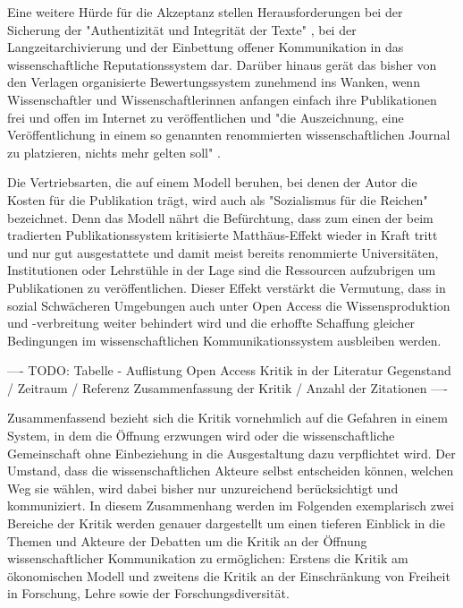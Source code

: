 Eine weitere Hürde für die Akzeptanz stellen Herausforderungen bei der Sicherung der "Authentizität und Integrität der Texte"  \cite{weishaupt_2009_goldenOA} \cite[:191]{Fehling_2014}, bei der Langzeitarchivierung \cite{hagner_2015_sache_buches} \cite{Martin_2013} und der Einbettung offener Kommunikation in das wissenschaftliche Reputationssystem \cite{weishaupt_2009_goldenOA} \cite{Suber_2002} \cite{Adema_2014_open_access} dar. Darüber hinaus gerät das bisher von den Verlagen organisierte Bewertungssystem zunehmend ins Wanken, wenn Wissenschaftler und Wissenschaftlerinnen anfangen einfach ihre Publikationen frei und offen im Internet zu veröffentlichen und "die Auszeichnung, eine Veröffentlichung in einem so genannten renommierten wissenschaftlichen Journal zu platzieren, nichts mehr gelten soll" \cite{Schirmbacher_oa_2007}.

Die Vertriebsarten, die auf einem Modell beruhen, bei denen der Autor die Kosten für die Publikation trägt, wird auch als "Sozialismus für die Reichen" \cite{cope2014future} bezeichnet. Denn das Modell nährt die Befürchtung, dass zum einen der beim tradierten Publikationssystem kritisierte Matthäus-Effekt wieder in Kraft tritt und nur gut ausgestattete und damit meist bereits renommierte Universitäten, Institutionen oder Lehrstühle in der Lage sind die Ressourcen aufzubrigen um Publikationen zu veröffentlichen. Dieser Effekt verstärkt die Vermutung, dass in sozial Schwächeren Umgebungen auch unter Open Access die Wissensproduktion und -verbreitung weiter behindert wird und die erhoffte Schaffung gleicher Bedingungen im wissenschaftlichen Kommunikationssystem ausbleiben werden.

---- TODO: Tabelle - Auflistung Open Access Kritik in der Literatur Gegenstand / Zeitraum / Referenz Zusammenfassung der Kritik / Anzahl der Zitationen ----

Zusammenfassend bezieht sich die Kritik vornehmlich auf die Gefahren in einem System, in dem die Öffnung erzwungen wird oder die wissenschaftliche Gemeinschaft ohne Einbeziehung in die Ausgestaltung dazu verpflichtet wird. Der Umstand, dass die wissenschaftlichen Akteure selbst entscheiden können, welchen Weg sie wählen, wird dabei bisher nur unzureichend berücksichtigt und kommuniziert. In diesem Zusammenhang werden im Folgenden exemplarisch zwei Bereiche der Kritik werden genauer dargestellt um einen tieferen Einblick in die Themen und Akteure der Debatten um die Kritik an der Öffnung wissenschaftlicher Kommunikation zu ermöglichen: Erstens die Kritik am ökonomischen Modell und zweitens die Kritik an der Einschränkung von Freiheit in Forschung, Lehre sowie der Forschungsdiversität.

